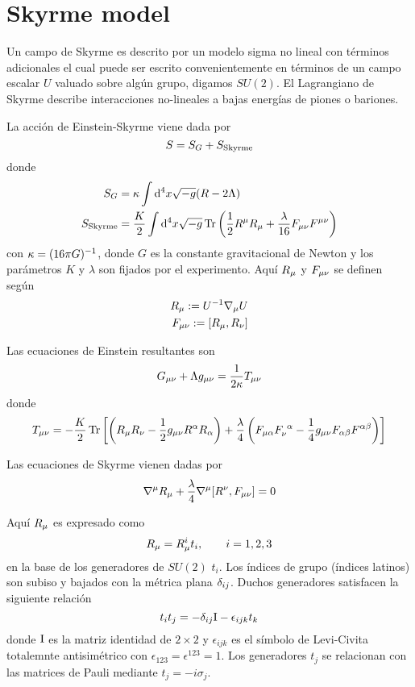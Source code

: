 \section{Skyrme model}
Un campo de Skyrme es descrito por un modelo sigma no lineal con términos adicionales el cual puede ser escrito convenientemente en términos de un campo escalar $U$ valuado sobre algún grupo, digamos $SU(2)$. El Lagrangiano de Skyrme describe interacciones no-lineales a bajas energías de piones o bariones.

La acción de Einstein-Skyrme viene dada por
\begin{equation}
  S=S_G+S_{\rm Skyrme}
\end{equation}
donde 
\begin{align}
  S_G&=\kappa\int\dd^4x\sqrt{-g}(R-2\Lambda)\\
  S_{\rm Skyrme}&=\frac{K}{2}\int\dd^4x\sqrt{-g}\Tr\left(\frac{1}{2}R^\mu R_\mu +\frac{\lambda}{16}F_{\mu\nu }F^{\mu\nu }\right)
\end{align}
con $\kappa=(16\pi G)^{-1}$, donde $G$ es la constante gravitacional de Newton y los parámetros $K$ y $\lambda$ son fijados por el experimento. Aquí $R_\mu $ y $F_{\mu\nu }$ se definen según
\begin{align}
  R_\mu :=U^{-1}\nabla_\mu U\label{R}\\
  F_{\mu\nu}:=[R_\mu, R_\nu ]\label{F}
\end{align}

Las ecuaciones de Einstein resultantes son
\begin{equation}
  G_{\mu\nu }+\Lambda g_{\mu\nu }=\frac{1}{2\kappa }T_{\mu\nu }
\end{equation}
donde
\begin{equation}\label{Tmn}
  T_{\mu\nu }=-\frac{K}{2}\Tr\left[\left(R_\mu R_\nu -\frac{1}{2}g_{\mu\nu }R^\alpha R_\alpha \right)+\frac{\lambda}{4}\left(F_{\mu\alpha }F_\nu ^{~\alpha }-\frac{1}{4}g_{\mu\nu }F_{\alpha\beta }F^{\alpha\beta}\right)\right]
\end{equation}

Las ecuaciones de Skyrme vienen dadas por
\begin{equation}
  \nabla^\mu R_\mu +\frac{\lambda}{4}\nabla^\mu [R^\nu ,F_{\mu\nu }]=0
\end{equation}

Aquí $R_\mu $ es expresado como
\begin{equation}
  R_\mu =R_\mu ^{i}t_i,\qquad i=1,2,3
\end{equation}
en la base de los generadores de $SU(2)$ $t_i$. Los índices de grupo (índices latinos) son subiso y bajados con la métrica plana $\delta_{ij}$. Duchos generadores satisfacen la siguiente relación
\begin{equation}\label{titj}
  t_it_j=-\delta_{ij}\mathrm{I}-\epsilon_{ijk}t_k
\end{equation}
donde $\mathrm{I} $ es la matriz identidad de $2\times 2$ y $\epsilon_{ijk}$ es el símbolo de Levi-Civita totalemnte antisimétrico con $\epsilon_{123}=\epsilon^{123}=1$. Los generadores $t_j$ se relacionan con las matrices de Pauli mediante $t_j=-i\sigma_j$.

